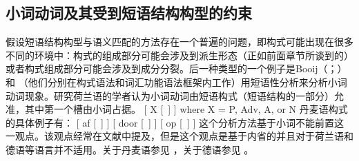 \begin{exe}
\begin{xlist}[iv.]
\begin{exe}
\begin{xlist}[iv.]
\subsection{小词动词及其受到短语结构构型的约束}
\label{sec-particle-verbs-phrasal}

\largerpage
假设短语结构构型与语义匹配的方法存在一个普遍的问题，即构式可能出现在很多不同的环境中：构式的组成部分可能会涉及到派生形态（正如前面章节所谈到的）或者构式组成部分可能会涉及到成分分裂。后一种类型的一个例子是Booij（\citeyear[\S~2]{Booij2002a}；\citeyear{Booij2012a-u}）和 \citet{Blom2005a}（他们分别在构式语法\indexcxg 和词汇功能语法\indexlfg 框架内工作）用短语性分析来分析小词动词现象。研究荷兰语的学者认为小词动词由短语构式（短语结构的一部分）允准，其中第一个槽由小词占据。
\ea
{}[ X [~] ] where X = P, Adv, A, or N
\z
丹麦语构式的具体例子有：
\eal
\label{particle-konstruktionen}
\ex {}[ af   [~] ]
\ex {}[ door [~] ]
\ex {}[ op   [~] ]
\zl 
这个分析方法基于小词不能前置这一观点。该观点经常在文献中提及，但是这个观点是基于内省的并且对于荷兰语和德语等语言并不适用。关于丹麦语参见 ，关于德语参见 。 

\end{xlist}
\end{exe}
\end{xlist}
\end{exe}

